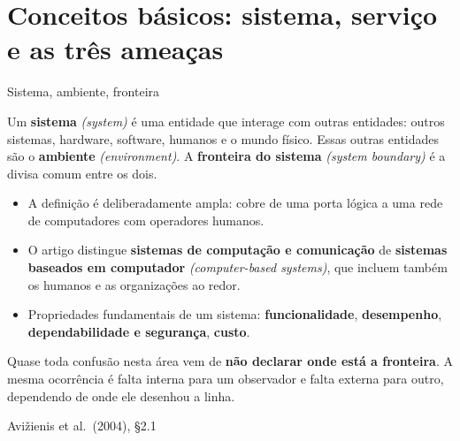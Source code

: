 \documentclass{beamer}
\newcommand{\en}[1]{{\color{depCinza}\textit{#1}}}
\newcommand{\sect}[1]{\par\smallskip\hfill{\tiny\color{black!55}Avi\v{z}ienis et al.\ (2004), #1}}
\begin{document}
\section{Conceitos b\'asicos: sistema, servi\c{c}o e as tr\^es amea\c{c}as}

\begin{frame}{Sistema, ambiente, fronteira}
    \footnotesize
    \begin{defi}
        \scriptsize
        Um \textbf{sistema} \en{(system)} \'e uma entidade que interage com outras entidades: outros sistemas, hardware, software, humanos e o mundo f\'isico. Essas outras entidades s\~ao o \textbf{ambiente} \en{(environment)}. A \textbf{fronteira do sistema} \en{(system boundary)} \'e a divisa comum entre os dois.
    \end{defi}
    \medskip
    \begin{itemize}
        \item A defini\c{c}\~ao \'e deliberadamente ampla: cobre de uma porta l\'ogica a uma rede de computadores com operadores humanos.
        \item O artigo distingue \textbf{sistemas de computa\c{c}\~ao e comunica\c{c}\~ao} de \textbf{sistemas baseados em computador} \en{(computer-based systems)}, que incluem tamb\'em os humanos e as organiza\c{c}\~oes ao redor.
        \item Propriedades fundamentais de um sistema: \textbf{funcionalidade}, \textbf{desempenho}, \textbf{dependabilidade e seguran\c{c}a}, \textbf{custo}.
    \end{itemize}
    \medskip
    \begin{armadilha}
        \scriptsize
        Quase toda confus\~ao nesta \'area vem de \textbf{n\~ao declarar onde est\'a a fronteira}. A mesma ocorr\^encia \'e falta interna para um observador e falta externa para outro, dependendo de onde ele desenhou a linha.
    \end{armadilha}
    \sect{\S2.1}
\end{frame}
\end{document}
